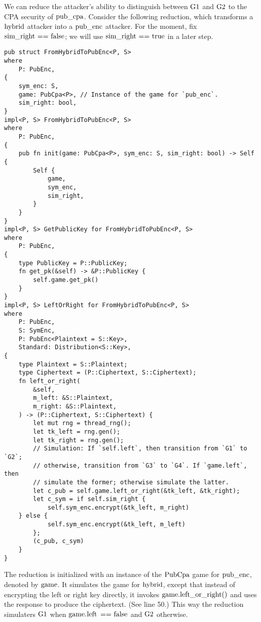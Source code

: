 We can reduce the attacker's ability to distinguish between $\code{G1}$ and
$\code{G2}$ to the CPA security of $\code{pub_cpa}$.
%
Consider the following reduction, which transforms a $\code{hybrid}$ attacker
into a $\code{pub_enc}$ attacker. For the moment, fix $\code{sim_right ==
false}$; we will use $\code{sim_right == true}$ in a later step.
%
\begin{lstlisting}
pub struct FromHybridToPubEnc<P, S>
where
    P: PubEnc,
{
    sym_enc: S,
    game: PubCpa<P>, // Instance of the game for `pub_enc`.
    sim_right: bool,
}
impl<P, S> FromHybridToPubEnc<P, S>
where
    P: PubEnc,
{
    pub fn init(game: PubCpa<P>, sym_enc: S, sim_right: bool) -> Self {
        Self {
            game,
            sym_enc,
            sim_right,
        }
    }
}
impl<P, S> GetPublicKey for FromHybridToPubEnc<P, S>
where
    P: PubEnc,
{
    type PublicKey = P::PublicKey;
    fn get_pk(&self) -> &P::PublicKey {
        self.game.get_pk()
    }
}
impl<P, S> LeftOrRight for FromHybridToPubEnc<P, S>
where
    P: PubEnc,
    S: SymEnc,
    P: PubEnc<Plaintext = S::Key>,
    Standard: Distribution<S::Key>,
{
    type Plaintext = S::Plaintext;
    type Ciphertext = (P::Ciphertext, S::Ciphertext);
    fn left_or_right(
        &self,
        m_left: &S::Plaintext,
        m_right: &S::Plaintext,
    ) -> (P::Ciphertext, S::Ciphertext) {
        let mut rng = thread_rng();
        let tk_left = rng.gen();
        let tk_right = rng.gen();
        // Simulation: If `self.left`, then transition from `G1` to `G2`;
        // otherwise, transition from `G3` to `G4`. If `game.left`, then
        // simulate the former; otherwise simulate the latter.
        let c_pub = self.game.left_or_right(&tk_left, &tk_right);
        let c_sym = if self.sim_right {
            self.sym_enc.encrypt(&tk_left, m_right)
    } else {
            self.sym_enc.encrypt(&tk_left, m_left)
        };
        (c_pub, c_sym)
    }
}
\end{lstlisting}
%
The reduction is initialized with an instance of the $\code{PubCpa}$ game for
$\code{pub_enc}$, denoted by $\code{game}$. It simulates the game for
$\code{hybrid}$, except that instead of encrypting the left or right key
directly, it invokes $\code{game.left_or_right()}$ and uses the response to
produce the ciphertext. (See line 50.) This way the reduction simulaters
$\code{G1}$ when $\code{game.left == false}$ and $\code{G2}$ otherwise.

%
%


